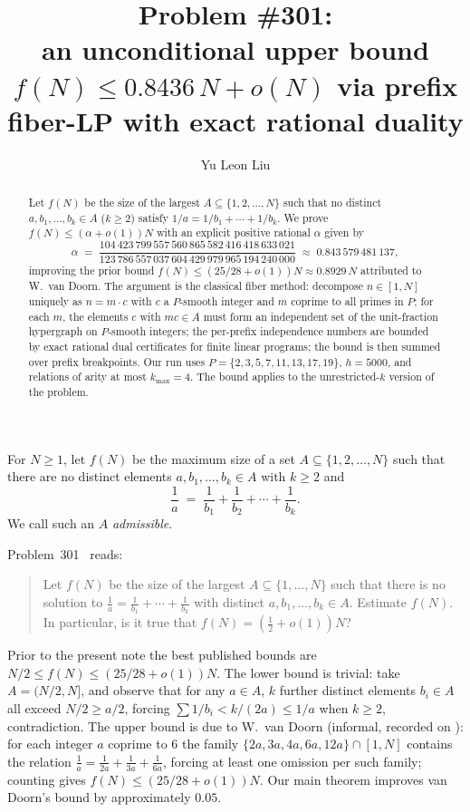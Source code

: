 \documentclass{amsart}
\title[\Erdos Problem \#301]{\Erdos Problem \#301: \\ {\tiny an unconditional upper bound $f(N) \leq 0.8436\,N + o(N)$ via prefix fiber-LP with exact rational duality}}
\author{Yu Leon Liu}
\begin{document}
\begin{abstract}
Let $f(N)$ be the size of the largest $A \subseteq \{1, 2, \ldots, N\}$
such that no distinct $a, b_1, \ldots, b_k \in A$ ($k \geq 2$) satisfy
$1/a = 1/b_1 + \cdots + 1/b_k$. We prove $f(N) \leq (\alpha + o(1)) N$
with an explicit positive rational $\alpha$ given by
\[
    \alpha \;=\; \frac{104\,423\,799\,557\,560\,865\,582\,416\,418\,633\,021}
                       {123\,786\,557\,037\,604\,429\,979\,965\,194\,240\,000}
    \;\approx\; 0.843\,579\,481\,137,
\]
improving the prior bound $f(N) \leq (25/28 + o(1)) N \approx 0.8929\,N$
attributed to W.\ van Doorn. The argument is the classical fiber method:
decompose $n \in [1, N]$ uniquely as $n = m \cdot c$ with $c$ a $P$-smooth
integer and $m$ coprime to all primes in $P$; for each $m$, the elements
$c$ with $m c \in A$ must form an independent set of the unit-fraction
hypergraph on $P$-smooth integers; the per-prefix independence numbers
are bounded by exact rational dual certificates for finite linear programs;
the bound is then summed over prefix breakpoints. Our run uses
$P = \{2, 3, 5, 7, 11, 13, 17, 19\}$, $h = 5000$, and relations of arity at
most $k_{\max} = 4$. The bound applies to the unrestricted-$k$ version of
the problem.
\end{abstract}

    \maketitle

\begin{definition}\label{def:f}
For $N \geq 1$, let $f(N)$ be the maximum size of a set $A \subseteq \{1, 2, \ldots, N\}$ such that there are no distinct elements $a, b_1, \ldots, b_k \in A$ with $k \geq 2$ and
\[
    \frac{1}{a} \;=\; \frac{1}{b_1} + \frac{1}{b_2} + \cdots + \frac{1}{b_k}.
\]
We call such an $A$ \emph{admissible}.
\end{definition}

Problem~301~\cite{bloom301} reads:
\begin{quote}
Let $f(N)$ be the size of the largest $A \subseteq \{1, \ldots, N\}$ such
that there is no solution to
$\tfrac{1}{a} = \tfrac{1}{b_1} + \cdots + \tfrac{1}{b_k}$ with distinct
$a, b_1, \ldots, b_k \in A$. Estimate $f(N)$. In particular, is it true
that $f(N) = (\tfrac{1}{2} + o(1)) N$?
\end{quote}

Prior to the present note the best published bounds are
$N/2 \leq f(N) \leq (25/28 + o(1)) N$.
The lower bound is trivial: take $A = (N/2, N]$, and observe that for any
$a \in A$, $k$ further distinct elements $b_i \in A$ all exceed $N/2 \geq a/2$,
forcing $\sum 1/b_i < k/(2a) \leq 1/a$ when $k \geq 2$, contradiction. The
upper bound is due to W.~van Doorn (informal, recorded on \cite{bloom301}):
for each integer $a$ coprime to $6$ the family
$\{2a, 3a, 4a, 6a, 12a\} \cap [1, N]$ contains the relation
$\tfrac{1}{a} = \tfrac{1}{2a} + \tfrac{1}{3a} + \tfrac{1}{6a}$, forcing at
least one omission per such family; counting gives
$f(N) \leq (25/28 + o(1)) N$. Our main theorem improves van Doorn's bound by
approximately $0.05$.
\end{document}
